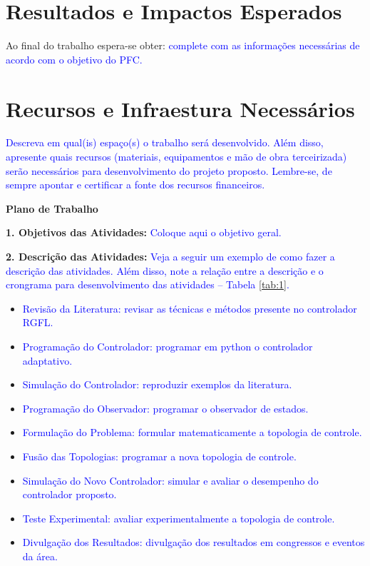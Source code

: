 \documentclass[oneside,a4paper,11pt]{article}
\newcommand{\orientacao}[1]{{\textcolor{blue}{#1}}}
\begin{document}
\section{Resultados e Impactos Esperados}\label{Resultados e Impactos Esperados}

Ao final do trabalho espera-se obter: \orientacao{complete com as informações necessárias de acordo com o objetivo do PFC.}

\section{Recursos e Infraestura Necessários}\label{Recursos Necessários}

\orientacao{Descreva em qual(is) espaço(s) o trabalho será desenvolvido. Além disso, apresente quais recursos (materiais, equipamentos e mão de obra terceirizada) serão necessários para desenvolvimento do projeto proposto. Lembre-se, de sempre apontar e certificar a fonte dos recursos financeiros.}




\newpage   
\begin{center}
\textbf{Plano de Trabalho} 
\end{center}

\noindent\textbf{1. Objetivos das Atividades:} 
\orientacao{Coloque aqui o objetivo geral.}

\vspace{.5cm}

\noindent\textbf{2. Descrição das Atividades:} \orientacao{Veja a seguir um exemplo de como fazer a descrição das atividades. Além disso, note a relação entre a descrição e o crongrama para desenvolvimento das atividades -- Tabela \ref{tab:1}.}

\begin{itemize}
\item[1.1] \orientacao{Revisão da Literatura: revisar as técnicas e métodos presente no controlador RGFL.}
\item[1.2] \orientacao{Programação do Controlador: programar em python o controlador adaptativo.}
\item[1.3] \orientacao{Simulação do Controlador: reproduzir exemplos da literatura.}
\item[2.1] \orientacao{Programação do Observador: programar o observador de estados.}
\item[3.1] \orientacao{Formulação do Problema: formular matematicamente a topologia de controle.}
\item[3.2] \orientacao{Fusão das Topologias: programar a nova topologia de controle.}
\item[3.3] \orientacao{Simulação do Novo Controlador: simular e avaliar o desempenho do controlador proposto.}
\item[4.1] \orientacao{Teste Experimental: avaliar experimentalmente a topologia de controle.}
\item[5.1] \orientacao{Divulgação dos Resultados: divulgação dos resultados em congressos e eventos da área.}
\end{itemize}
\end{document}
